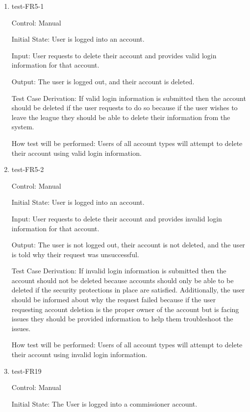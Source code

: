 \documentclass[12pt, titlepage]{article}
\begin{document}
\begin{enumerate}
  \item{test-FR5-1\\}

  Control: Manual
           
  Initial State: User is logged into an account.
           
  Input: User requests to delete their account and provides valid login
  information for that account.
           
  Output: The user is logged out, and their account is deleted.
 
  Test Case Derivation: If valid login information is submitted then the
  account should be deleted if the user requests to do so because if the user
  wishes to leave the league they should be able to delete their information
  from the system.
 
  How test will be performed: Users of all account types will attempt to delete
  their account using valid login information.

  \item{test-FR5-2\\}

  Control: Manual
           
  Initial State: User is logged into an account.
           
  Input: User requests to delete their account and provides invalid login
  information for that account.
           
  Output: The user is not logged out, their account is not deleted, and
  the user is told why their request was unsuccessful.
 
  Test Case Derivation: If invalid login information is submitted then the
  account should not be deleted because accounts should only be able to be
  deleted if the security protections in place are satisfied. Additionally,
  the user should be informed about why the request failed because if the
  user requesting account deletion is the proper owner of the account but is
  facing issues they should be provided information to help them troubleshoot
  the issues.
 
  How test will be performed: Users of all account types will attempt to delete
  their account using invalid login information.

  \item{test-FR19\\}

  Control: Manual
           
  Initial State: The User is logged into a commissioner account.
           

\end{enumerate}
\end{document}
